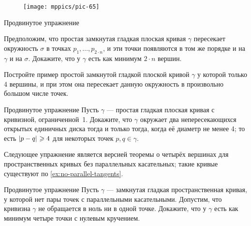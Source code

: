 \begin{wrapfigure}[5]{r}{25 mm}
\vskip-7mm
\centering
\texttt{[image: mppics/pic-65]}
\vskip0mm
\end{wrapfigure}

\begin{thm}{Продвинутое упражнение}\label{ex:curve-crosses-circle}
{\sloppy
Предположим, что простая замкнутая гладкая плоская кривая $\gamma$  пересекает окружность $\sigma$ в точках $p_1,\dots,p_{2{\cdot} n}$, и эти точки появляются в том же порядке и на $\gamma$ и на $\sigma$.
Докажите, что у $\gamma$ есть как минимум $2\cdot n$ вершин.

}

Постройте пример простой замкнутой гладкой плоской кривой $\gamma$ у которой только 4 вершины, и при этом она пересекает данную окружность в произвольно большом числе точек.
\end{thm}

{\sloppy

\begin{thm}{Продвинутое упражнение}\label{ex:berk}
Пусть $\gamma$ --- простая гладкая плоская кривая с кривизной, ограниченной~1.
Докажите, что $\gamma$ окружает два непересекающихся открытых единичных диска тогда и только тогда, когда её диаметр не менее 4;
то есть $\dist{p}{q}{}\ge 4$ для некоторых точек $p,q\in\gamma$.
\end{thm}

}


Следующее упражнение является версией теоремы о четырёх вершинах для пространственных кривых без параллельных касательных; такие кривые существуют по \ref{ex:no-parallel-tangents}.

\begin{thm}{Продвинутое упражнение}\label{ex:4x0-torsion}
Пусть $\gamma$ --- замкнутая гладкая пространственная кривая, у которой нет пары точек с параллельными касательными.
Допустим, что кривизна $\gamma$ не обращается в ноль ни в одной точке.
Докажите, что у $\gamma$ есть как минимум четыре точки с нулевым кручением.
\end{thm}

